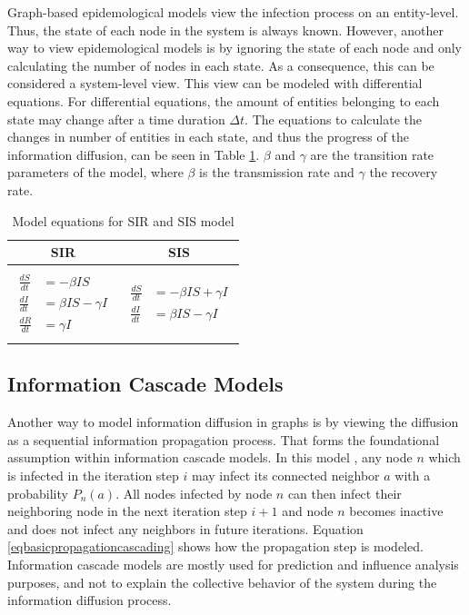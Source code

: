 Graph-based epidemological models view the infection process on an entity-level.
Thus, the state of each node in the system is always known.
However, another way to view epidemological models is by ignoring the 
state of each node and only calculating the number of nodes in each state.
As a consequence, this can be considered a system-level view.
This view can be modeled with differential equations.
For differential equations, the amount of entities belonging to each state may change 
after a time duration $\Delta t$. The equations to calculate the 
changes in number of entities in each state, and thus the progress 
of the information diffusion, can be seen in Table \ref{SI-table-equations}.
$\beta$ and $\gamma$ are the transition rate parameters of the model,
where $\beta$ is the transmission rate and $\gamma$ the 
recovery rate.

\begin{table}[ht!]
    \centering
    \begin{tabular}{|c | c |} 
     \hline
     SIR & SIS  \\ 
     \hline
     & \\
     $\begin{aligned}
          \frac{dS}{dt} &= -\beta I S \\
          \frac{dI}{dt} &= \beta I S - \gamma I \\
          \frac{dR}{dt} &= \gamma I  
        \end{aligned}$
      &
      $\begin{aligned}
          \frac{dS}{dt} &= -\beta I S + \gamma I\\
          \frac{dI}{dt} &= \beta I S - \gamma I
        \end{aligned}$
       \\ 
       & \\
     \hline
    \end{tabular}
    \caption{Model equations for SIR and SIS model \cite{sirequation}}
    \label{SI-table-equations}
\end{table}


\subsection{Information Cascade Models}

Another way to model information diffusion in graphs is by viewing the diffusion as a 
sequential information propagation process. That forms the foundational 
assumption within information cascade models. In this model 
\cite{reviewinformationdiffusion}, any node $n$ which is infected in the
iteration step $i$ may infect its connected neighbor $a$ with a 
probability $P_n(a)$. All nodes infected by node $n$
can then infect their neighboring node in the next iteration step $i+1$
and node $n$ becomes inactive and does not infect any neighbors in future
iterations.
Equation \ref{eqbasicpropagationcascading} 
shows how the propagation step is modeled.
Information cascade models are mostly used for prediction and influence 
analysis purposes, and not to explain the collective behavior
of the system during the information diffusion process.

